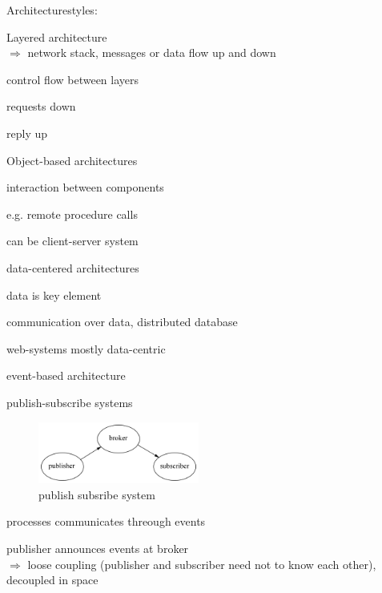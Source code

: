 \documentclass[ngerman,a4paper]{report}
\begin{document}
Architecturestyles:\\
\begin{compactitem}
\item Layered architecture\\
$\Rightarrow$ network stack, messages or data flow up and down\\
\begin{compactitem}
\item control flow between layers
\item requests down
\item reply up
\end{compactitem}
\item Object-based architectures\\
\begin{compactitem}
\item interaction between components
\item e.g. remote procedure calls
\item can be client-server system
\end{compactitem}
\item data-centered architectures\\
\begin{compactitem}
\item data is key element
\item communication over data, distributed database
\item web-systems mostly data-centric
\end{compactitem}
\item event-based architecture\\
\begin{compactitem}
\item publish-subscribe systems
\begin{figure}[h]
	\centering
	\includegraphics[width=200px]{gfx/pub_sub.png}
	\caption{publish subsribe system}
	\label{img:publish_subscribe}
\end{figure}
\item processes communicates threough events
\item publisher announces events at broker\\
$\Rightarrow$ loose coupling (publisher and subscriber need not to know each other), decoupled in space\\

\end{compactitem}
\end{compactitem}
\end{document}
